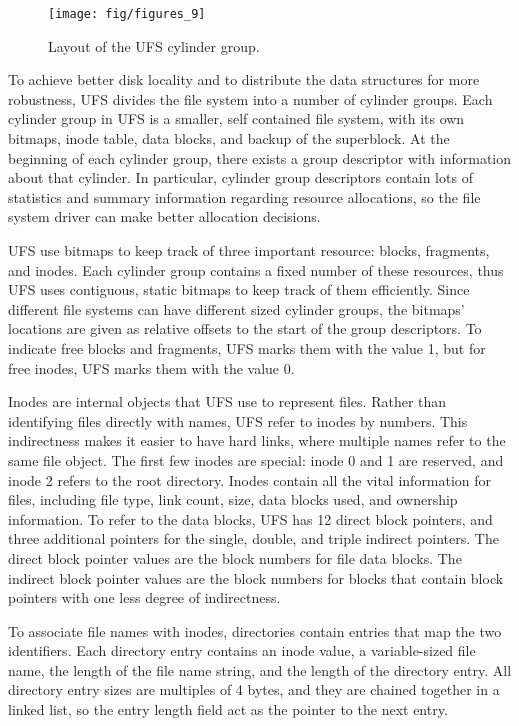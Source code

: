 \begin{figure}[htb]
  \centering
  \texttt{[image: fig/figures\_9]}
  \caption{\label{fig:ufs_cg} Layout of the UFS cylinder group.}
\end{figure}

To achieve better disk locality and to distribute the data structures for
more robustness, UFS divides the file system into a number of cylinder groups.
Each cylinder group in UFS is a smaller, self contained file system, with its
own bitmaps, inode table, data blocks, and backup of the superblock. At the
beginning of each cylinder group, there exists a group descriptor with
information about that cylinder. In particular, cylinder group descriptors
contain lots of statistics and summary information regarding resource
allocations, so the file system driver can make better allocation decisions.

UFS use bitmaps to keep track of three important resource: blocks, fragments,
and inodes. Each cylinder group contains a fixed number of these resources,
thus UFS uses contiguous, static bitmaps to keep track of them efficiently.
Since different file systems can have different sized cylinder groups, the
bitmaps' locations are given as relative offsets to the start of the group
descriptors. To indicate free blocks and fragments, UFS marks them with the
value 1, but for free inodes, UFS marks them with the value 0.

Inodes are internal objects that UFS use to represent files. Rather than
identifying files directly with names, UFS refer to inodes by numbers. This
indirectness makes it easier to have hard links, where multiple names refer to
the same file object. The first few inodes are special: inode 0 and 1 are
reserved, and inode 2 refers to the root directory. Inodes contain all the
vital information for files, including file type, link count, size, data blocks
used, and ownership information. To refer to the data blocks, UFS has 12 direct
block pointers, and three additional pointers for the single, double, and
triple indirect pointers. The direct block pointer values are the block numbers
for file data blocks. The indirect block pointer values are the block numbers
for blocks that contain block pointers with one less degree of indirectness.

To associate file names with inodes, directories contain entries that map
the two identifiers. Each directory entry contains an inode value, a
variable-sized file name, the length of the file name string, and the length
of the directory entry. All directory entry sizes are multiples of 4 bytes,
and they are chained together in a linked list, so the entry length field act
as the pointer to the next entry.

